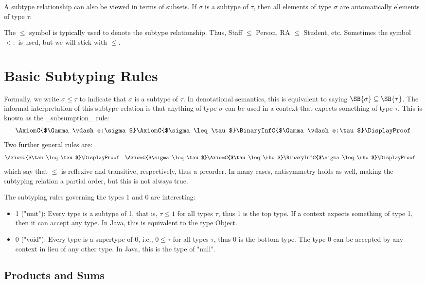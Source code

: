 A subtype relationship can also be viewed in terms of subsets. If
$\sigma$ is a subtype of $\tau$, then all elements of type $\sigma$
are automatically elements of type $\tau$.

The $\leq$ symbol is typically used to denote the subtype
relationship. Thus, Staff $\leq$ Person, RA $\leq$ Student,
etc. Sometimes the symbol $\lt:$ is used, but we will stick with
$\leq$.

\section{Basic Subtyping Rules}

Formally, we write $\sigma \leq \tau$ to indicate that $\sigma$ is a
subtype of $\tau$. In denotational semantics, this is equivalent to
saying $\SB{\sigma}\subseteq\SB{\tau}$. The informal interpretation of
this subtype relation is that anything of type $\sigma$ can be used in
a context that expects something of type $\tau$. This is known as the
_subsumption_ rule:
\begin{gather*}
\AxiomC{$\Gamma\vdash e:\sigma$}
\AxiomC{$\sigma\leq\tau$}
\BinaryInfC{$\Gamma\vdash e:\tau$}
\DisplayProof
\end{gather*}
Two further general rules are:
\begin{align*}
&
\AxiomC{$\tau \leq \tau$}
\DisplayProof
&&
\AxiomC{$\sigma \leq \tau$}
\AxiomC{$\tau \leq \rho$}
\BinaryInfC{$\sigma \leq \rho$}
\DisplayProof
\end{align*}
which say that $\leq$ is reflexive and transitive, respectively, thus a preorder. In many cases, antisymmetry holds as well, making the subtyping relation a partial order, but this is not always true.

The subtyping rules governing the types 1 and 0 are interesting:
\begin{itemize}
\item 1 ("unit"): Every type is a subtype of 1, that is, $\tau\leq 1$ for all types $\tau$, thus 1 is the top type. If a context expects something of type 1, then it can accept any type. In Java, this is equivalent to the type Object.
\item 0 ("void"): Every type is a supertype of 0, i.e., $0 \leq \tau$ for all types $\tau$, thus 0 is the bottom type. The type 0 can be accepted by any context in lieu of any other type. In Java, this is the type of "null".
\end{itemize}

\subsection{Products and Sums}

